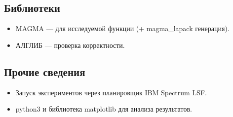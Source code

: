 \documentclass[12pt]{article}
\begin{document}
	
	\subsection{Библиотеки}
	\begin{itemize}
		\item MAGMA --- для исследуемой функции (+ magma\_lapack генерация).
		\item АЛГЛИБ --- проверка корректности.
	\end{itemize}
	
	\subsection{Прочие сведения}
	\begin{itemize}
		\item Запуск экспериментов через планировщик IBM Spectrum LSF.
		\item python3 и библиотека matplotlib для анализа результатов.
	\end{itemize}
	
\end{document}
